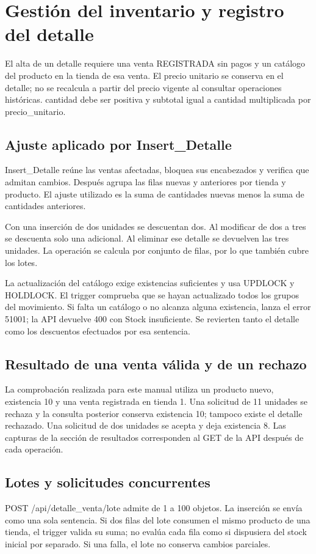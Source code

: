 
\section{Gestión del inventario y registro del detalle}
El alta de un detalle requiere una venta REGISTRADA sin pagos y un catálogo del producto en la tienda de esa venta. El precio unitario se conserva en el detalle; no se recalcula a partir del precio vigente al consultar operaciones históricas. cantidad debe ser positiva y subtotal igual a cantidad multiplicada por precio\_unitario.

\subsection{Ajuste aplicado por Insert\_Detalle}
Insert\_Detalle reúne las ventas afectadas, bloquea sus encabezados y verifica que admitan cambios. Después agrupa las filas nuevas y anteriores por tienda y producto. El ajuste utilizado es la suma de cantidades nuevas menos la suma de cantidades anteriores.

Con una inserción de dos unidades se descuentan dos. Al modificar de dos a tres se descuenta solo una adicional. Al eliminar ese detalle se devuelven las tres unidades. La operación se calcula por conjunto de filas, por lo que también cubre los lotes.

La actualización del catálogo exige existencias suficientes y usa UPDLOCK y HOLDLOCK. El trigger comprueba que se hayan actualizado todos los grupos del movimiento. Si falta un catálogo o no alcanza alguna existencia, lanza el error 51001; la API devuelve 400 con Stock insuficiente. Se revierten tanto el detalle como los descuentos efectuados por esa sentencia.

\subsection{Resultado de una venta válida y de un rechazo}
La comprobación realizada para este manual utiliza un producto nuevo, existencia 10 y una venta registrada en tienda 1. Una solicitud de 11 unidades se rechaza y la consulta posterior conserva existencia 10; tampoco existe el detalle rechazado. Una solicitud de dos unidades se acepta y deja existencia 8. Las capturas de la sección de resultados corresponden al GET de la API después de cada operación.


\subsection{Lotes y solicitudes concurrentes}
POST /api/detalle\_venta/lote admite de 1 a 100 objetos. La inserción se envía como una sola sentencia. Si dos filas del lote consumen el mismo producto de una tienda, el trigger valida su suma; no evalúa cada fila como si dispusiera del stock inicial por separado. Si una falla, el lote no conserva cambios parciales.


